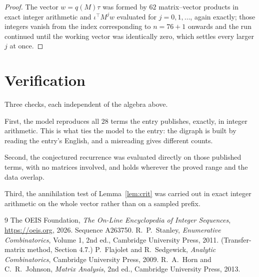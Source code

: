\documentclass[11pt,a4paper]{article}
\theoremstyle{plain}
\theoremstyle{definition}
\begin{document}
\begin{proof}
The vector $w=q(M)\tau$ was formed by $62$ matrix--vector products in exact integer
arithmetic and $\iota^{\!\top}M^{j}w$ evaluated for $j=0,1,\dots$, again exactly; those
integers vanish from the index corresponding to $n=76+1$ onwards and the run continued
until the working vector was identically zero, which settles every larger $j$ at once.
\end{proof}

\section{Verification}

Three checks, each independent of the algebra above.

First, the model reproduces all $28$ terms the entry publishes, exactly, in integer
arithmetic. This is what ties the model to the entry: the digraph is built by reading the
entry's English, and a misreading gives different counts.

Second, the conjectured recurrence was evaluated directly on those published terms, with no
matrices involved, and holds wherever the proved range and the data overlap.

Third, the annihilation test of Lemma~\ref{lem:crit} was carried out in exact integer
arithmetic on the whole vector rather than on a sampled prefix.

\begin{thebibliography}{9}
 The OEIS Foundation, \emph{The On-Line Encyclopedia of Integer
Sequences}, \url{https://oeis.org}, 2026. Sequence A263750.
 R.~P.~Stanley, \emph{Enumerative Combinatorics}, Volume 1, 2nd ed.,
Cambridge University Press, 2011. (Transfer-matrix method, Section 4.7.)
 P.~Flajolet and R.~Sedgewick, \emph{Analytic Combinatorics}, Cambridge
University Press, 2009.
 R.~A.~Horn and C.~R.~Johnson, \emph{Matrix Analysis}, 2nd ed., Cambridge
University Press, 2013.
\end{thebibliography}
\end{document}
